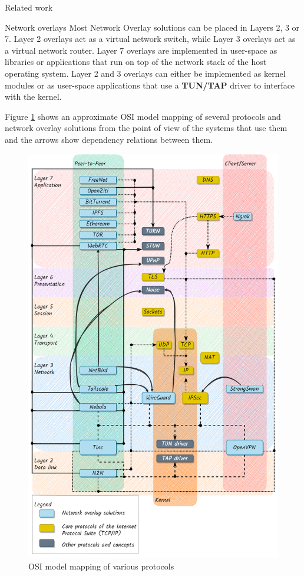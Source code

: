 \begin{frame}[fragile]{Related work}
\begin{block}{Network overlays}
\protect\hypertarget{thesis__020-related-work.md__network-overlays}{}
Most Network Overlay solutions can be placed in Layers 2, 3 or 7. Layer
2 overlays act as a virtual network switch, while Layer 3 overlays act
as a virtual network router. Layer 7 overlays are implemented in
user-space as libraries or applications that run on top of the network
stack of the host operating system. Layer 2 and 3 overlays can either be
implemented as kernel modules or as user-space applications that use a
\textbf{TUN/TAP} driver to interface with the kernel.

Figure \ref{osi-map-overlays} shows an approximate OSI model mapping of
several protocols and network overlay solutions from the point of view
of the systems that use them and the arrows show dependency relations
between them.

\begin{figure}
\centering
\includegraphics[width=\textwidth,height=0.9\textheight]{thesis/../figures/osi-map-overlays.png}
\caption{OSI model mapping of various protocols
\label{osi-map-overlays}}
\end{figure}


\end{block}
\end{frame}
